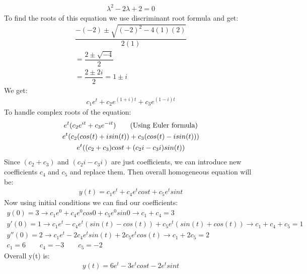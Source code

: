 \documentclass[10pt,a4paper, margin=1in]{article}
\begin{document}
\begin{enumerate}
\begin{enumerate}
    \begin{gather*}
        \lambda^2-2\lambda+2 = 0
    \end{gather*}
    To find the roots of this equation we use discriminant root formula and get:
    \begin{gather*}
        \dfrac{-(-2) \pm \sqrt{(-2)^2-4(1)(2)}}{2(1)} \\
        = \dfrac{2\pm\sqrt{-4}}{2} \\
        = \dfrac{2\pm2i}{2}
        = 1\pm i
    \end{gather*}
    We get:
    \begin{gather*}
        c_1e^t+c_2e^{(1+i)t}+c_3e^{(1-i)t}
    \end{gather*}
    To handle complex roots of the equation:
    \begin{gather*}
        e^t(c_2e^{it}+c_3e^{-it})  \text{\qquad (Using Euler formula)}\\
        e^t(c_2(cos(t)+isin(t))+c_3(cos(t)-isin(t))) \\
        e^t((c_2+c_3)cost+(c_2i-c_3i)sin(t))
    \end{gather*}
    Since $(c_2+c_3)$ and $(c_2i-c_3i)$ are just coefficients, we can introduce new coefficients $c_4$ and $c_5$ and replace them. Then overall homogeneous equation will be:
    \begin{gather*}
        y(t) = c_1e^t+c_4e^tcost+c_5e^tsint
    \end{gather*}
    Now using initial conditions we can find our coefficients:
    \begin{gather*}
        y(0)=3 \rightarrow c_1e^0+c_4e^0cos0+c_5e^0sin0 \rightarrow c_1+c_4 = 3 \\
        y'(0)=1 \rightarrow c_1e^t-c_4e^t(sin(t)-cos(t))+c_5e^t(sin(t)+cos(t)) \rightarrow c_1+c_4+c_5=1 \\
        y''(0)=2 \rightarrow c_1e^t-2c_4e^tsin(t)+2c_5e^tcos(t) \rightarrow c_1+2c_5=2 \\
        c_1 = 6 \qquad c_4=-3 \qquad c_5=-2
    \end{gather*}
    Overall y(t) is:
    \begin{gather*}
        y(t)= 6e^t-3e^tcost-2e^tsint
    \end{gather*}
    \end{enumerate}



\end{enumerate}
\end{document}
